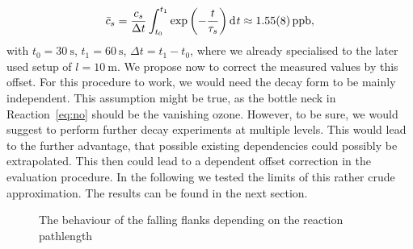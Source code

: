 \begin{align}
  \bar c_s = \frac{c_s}{\Delta t} \int_{t_0}^{t_1}
  \exp\left(-\frac{t}{\tau_s}\right)\d[t] \approx \SI{1.55(8)}{ppb},\label{eq:offset}
\end{align}
with $t_0 = \SI{30}{\second}$, $t_1 = \SI{60}{\second}$, $\Delta t =
t_1 - t_0$, where we already specialised to the later used setup of $l
= \SI{10}{\meter}$. We propose now to correct the measured 
values by this offset. For this procedure to work, we would need the
decay form to be mainly  independent. This assumption might be
true, as the bottle neck in Reaction~\eqref{eq:no} should be the
vanishing ozone. However, to be sure, we would suggest to perform
further decay experiments at multiple  levels. This would lead
to the further advantage, that possible existing  dependencies
could possibly be extrapolated. This then could lead to a 
dependent offset correction in the evaluation procedure.
In the following we tested the limits of this rather crude
approximation. The results can be found in the next section.

\begin{figure}[htbp]
  \centering
  
  \caption{The behaviour of the falling flanks depending on the
    reaction pathlength}
  \label{fig:switch-pl}
\end{figure}


